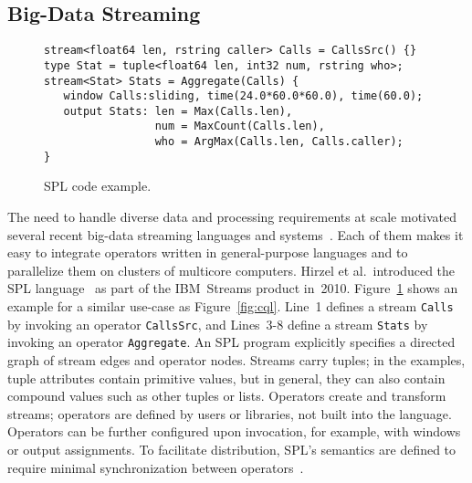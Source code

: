 \subsection{Big-Data Streaming}\label{sec:big} %

\begin{figure}[!h]
\begin{lstlisting}[xleftmargin=2mm,morekeywords={stream,float64,rstring,type,int32,window,output,tuple}]
stream<float64 len, rstring caller> Calls = CallsSrc() {}
type Stat = tuple<float64 len, int32 num, rstring who>;
stream<Stat> Stats = Aggregate(Calls) {
   window Calls:sliding, time(24.0*60.0*60.0), time(60.0);
   output Stats: len = Max(Calls.len),
                 num = MaxCount(Calls.len),
                 who = ArgMax(Calls.len, Calls.caller);
}
\end{lstlisting}
\vspace*{-4mm}
\caption{\label{fig:spl}SPL code example.}
\end{figure}

The need to handle diverse data and processing requirements at scale
motivated several recent big-data streaming languages and
systems~\cite{akidau_et_al_2013,carbone_et_al_2015,hirzel_schneider_gedik_2017,toshniwal_et_al_2014,zaharia_et_al_2013}.
Each of them makes it easy to integrate operators written in
general-purpose languages and to parallelize them on clusters of
multicore computers. Hirzel et al.\ introduced the SPL
language~\cite{hirzel_schneider_gedik_2017} as part of the IBM~Streams
product in~2010. Figure~\ref{fig:spl} shows an example for a similar
use-case as Figure~\ref{fig:cql}. Line~1 defines a stream
\lstinline{Calls} by invoking an operator \lstinline{CallsSrc}, and
\mbox{Lines 3-8} define a stream \lstinline{Stats} by invoking an
operator \lstinline{Aggregate}. An SPL program explicitly specifies a
directed graph of stream edges and operator nodes. Streams carry
tuples; in the examples, tuple attributes contain primitive values,
but in general, they can also contain compound values such as other
tuples or lists.  Operators create and transform streams; operators
are defined by users or libraries, not built into the
language. Operators can be further configured upon invocation, for
example, with windows or output assignments. To facilitate
distribution, SPL's semantics are defined to require minimal
synchronization between operators~\cite{soule_et_al_2016}.


